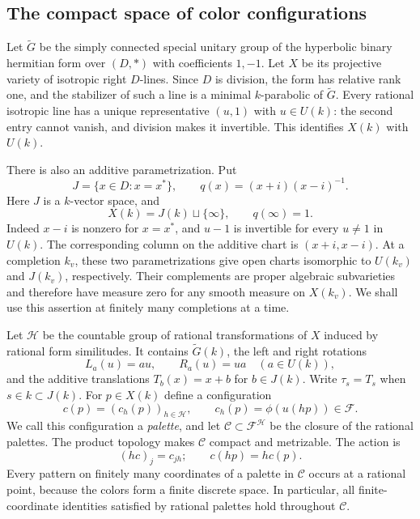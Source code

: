 \subsection{The compact space of color configurations}

Let $\widetilde G$ be the simply connected special unitary group of the
hyperbolic binary hermitian form over $(D,*)$ with coefficients $1,-1$.
Let $X$ be its projective variety of isotropic right $D$-lines.
Since $D$ is division, the form has relative rank one, and the stabilizer
of such a line is a minimal $k$-parabolic of $\widetilde G$.
Every rational isotropic line has a unique representative $(u,1)$ with
$u\in U(k)$: the second entry cannot vanish, and division makes it
invertible. This identifies $X(k)$ with $U(k)$.

There is also an additive parametrization. Put
\[
 J=\{x\in D:x=x^*\},\qquad
 q(x)=(x+i)(x-i)^{-1}.
\]
Here $J$ is a $k$-vector space, and
\begin{equation}\label{eq:palette-cayley}
 X(k)=J(k)\sqcup\{\infty\},\qquad q(\infty)=1.
\end{equation}
Indeed $x-i$ is nonzero for $x=x^*$, and $u-1$ is invertible for every
$u\ne1$ in $U(k)$. The corresponding column on the additive chart is
$(x+i,x-i)$. At a completion $k_v$, these two parametrizations give open
charts isomorphic to $U(k_v)$ and $J(k_v)$, respectively. Their
complements are proper algebraic subvarieties and therefore have measure
zero for any smooth measure on $X(k_v)$. We shall use this assertion at
finitely many completions at a time.

Let $\mathcal H$ be the countable group of rational transformations of
$X$ induced by rational form similitudes. It contains $\widetilde G(k)$,
the left and right rotations
\[
 L_a(u)=au,\qquad R_a(u)=ua\quad(a\in U(k)),
\]
and the additive translations $T_b(x)=x+b$ for $b\in J(k)$.
Write $\tau_s=T_s$ when $s\in k\subset J(k)$.
For $p\in X(k)$ define a configuration
\[
 c(p)=(c_h(p))_{h\in\mathcal H},\qquad
 c_h(p)=\phi(u(hp))\in\mathcal F.
\]
We call this configuration a \emph{palette}, and let
$\mathcal C\subset\mathcal F^{\mathcal H}$ be the closure of the rational
palettes. The product topology makes $\mathcal C$ compact and metrizable.
The action is
\[
 (h c)_j=c_{jh};\qquad c(hp)=h c(p).
\]
Every pattern on finitely many coordinates of a palette in $\mathcal C$
occurs at a rational point, because the colors form a finite discrete
space. In particular, all finite-coordinate identities satisfied by
rational palettes hold throughout $\mathcal C$.


